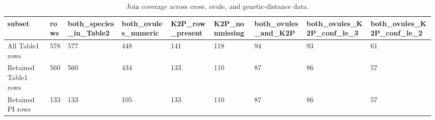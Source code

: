 \begin{table}
\caption{Join coverage across cross, ovule, and genetic-distance data.}
\label{tab:join_coverage}
\begin{adjustbox}{max width=\textwidth}
\begin{tabular}{lllllllll}
\toprule
subset & rows & both\_species\_in\_Table2 & both\_ovules\_numeric & K2P\_row\_present & K2P\_nonmissing & both\_ovules\_and\_K2P & both\_ovules\_K2P\_conf\_le\_3 & both\_ovules\_K2P\_conf\_le\_2 \\
\midrule
All Table1 rows & 578 & 577 & 448 & 141 & 118 & 94 & 93 & 61 \\
Retained Table1 rows & 560 & 560 & 434 & 133 & 110 & 87 & 86 & 57 \\
Retained PI rows & 133 & 133 & 105 & 133 & 110 & 87 & 86 & 57 \\
\bottomrule
\end{tabular}
\end{adjustbox}
\end{table}
